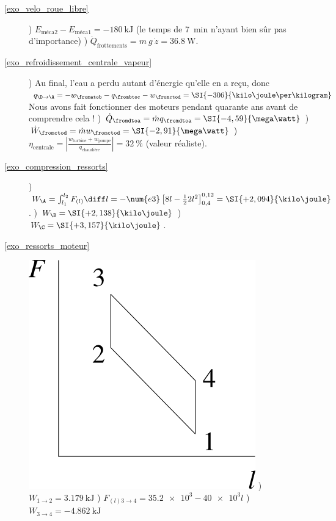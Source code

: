 \begin{description}
	\item[\ref{exo_velo_roue_libre}] 
				) $E_{\text{méca}2} - E_{\text{méca}1} = \SI{-180}{\kilo\joule}$ (le temps de \SI{7}{\minute} n’ayant bien sûr pas d’importance) 
				) $\dot Q_{\text{frottements}} = m \ g \ \dot z = \SI{36,8}{\watt}$.
	\item[\ref{exo_refroidissement_centrale_vapeur}] 	
				) Au final, l’eau a perdu autant d’énergie qu’elle en a reçu, donc $q_{\D \to \A} = - w_\fromatob - q_\frombtoc - w_\fromctod = \SI{-306}{\kilo\joule\per\kilogram} $ Nous avons fait fonctionner des moteurs pendant quarante ans avant de comprendre cela !
				) $\dot Q_\fromdtoa = \dot m q_\fromdtoa = \SI{-4,59}{\mega\watt}$
				) $\dot W_\fromctod = \dot m w_\fromctod = \SI{-2,91}{\mega\watt}$
				) $\eta_{\text{centrale}} = \left|\frac{w_{\text{turbine}} + w_{\text{pompe}}}{q_{\text{chaudière}}}\right| = \SI{32}{\percent}$ (valeur réaliste).
	\item [\ref{exo_compression_ressorts}]
				) $W_\A = \int_{l_1}^{l_2} F_{(l)} \diff l = - \num{e3} \left[ 8 l - \frac{1}{2} 2 l^2 \right]_{0,4}^{0,12} = \SI{+2,094}{\kilo\joule}$.
				) $W_\B = \SI{+2,138}{\kilo\joule}$ 
				) $W_\C = \SI{+3,157}{\kilo\joule}$.
	\item [\ref{exo_ressorts_moteur}] 
				\includegraphics[width=\solutiondiagramwidth]{images/exo_sol_fl_ressorts_moteur.png}
				) $W_{1 \to 2} = \SI{+3,179}{\kilo\joule}$ 
				) $F_{(l) 3 \to 4} = \num{35,2e3} - \num{40e3} l$
				) $W_{3 \to 4} = \SI{-4,862}{\kilo\joule}$

\end{description}
